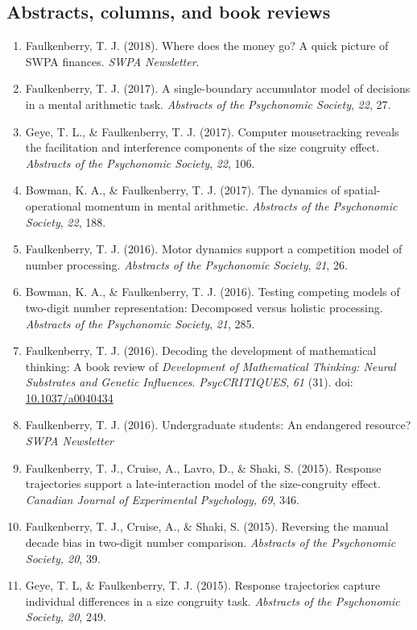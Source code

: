\documentclass[article,10pt]{article}
\begin{document}
\subsection*{Abstracts, columns, and book reviews}
\label{sec:orgb3a1cdb}
\begin{enumerate}
\item Faulkenberry, T. J. (2018). Where does the money go? A quick picture of SWPA finances. \emph{SWPA Newsletter}.
\item Faulkenberry, T. J. (2017). A single-boundary accumulator model of decisions in a mental arithmetic task. \emph{Abstracts of the Psychonomic Society}, \emph{22}, 27.
\item Geye, T. L., \& Faulkenberry, T. J. (2017). Computer mousetracking reveals the facilitation and interference components of the size congruity effect. \emph{Abstracts of the Psychonomic Society}, \emph{22}, 106.
\item Bowman, K. A., \& Faulkenberry, T. J. (2017). The dynamics of spatial-operational momentum in mental arithmetic. \emph{Abstracts of the Psychonomic Society}, \emph{22}, 188.
\item Faulkenberry, T. J. (2016). Motor dynamics support a competition model of number processing. \emph{Abstracts of the Psychonomic Society}, \emph{21}, 26.
\item Bowman, K. A., \& Faulkenberry, T. J. (2016). Testing competing models of two-digit number representation: Decomposed versus holistic processing. \emph{Abstracts of the Psychonomic Society}, \emph{21}, 285.
\item Faulkenberry, T. J. (2016). Decoding the development of mathematical thinking: A book review of \emph{Development of Mathematical Thinking: Neural Substrates and Genetic Influences}. \emph{PsycCRITIQUES}, \emph{61} (31). doi: \href{http://dx.doi.org/10.1037/a0040434}{10.1037/a0040434}
\item Faulkenberry, T. J. (2016). Undergraduate students: An endangered resource? \emph{SWPA Newsletter}
\item Faulkenberry, T. J., Cruise, A., Lavro, D., \& Shaki, S. (2015). Response trajectories support a late-interaction model of the size-congruity effect. \emph{Canadian Journal of Experimental Psychology, 69}, 346.
\item Faulkenberry, T. J., Cruise, A., \& Shaki, S. (2015). Reversing the manual decade bias in two-digit number comparison. \emph{Abstracts of the Psychonomic Society, 20}, 39.
\item Geye, T. L, \& Faulkenberry, T. J. (2015). Response trajectories capture individual differences in a size congruity task. \emph{Abstracts of the Psychonomic Society, 20}, 249.

\end{enumerate}
\end{document}
